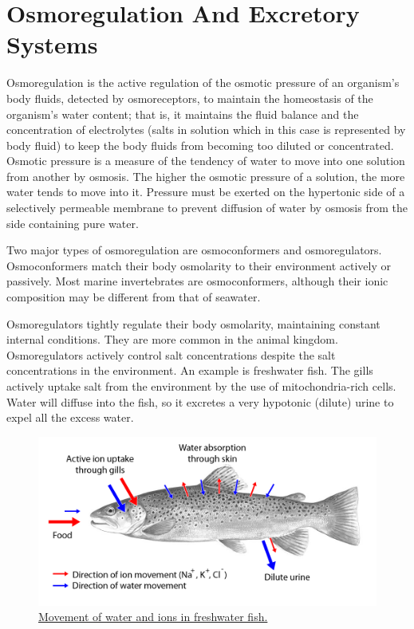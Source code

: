 \hypertarget{osmoregulation-and-excretory-systems}{%
\chapter{Osmoregulation And Excretory Systems}\label{osmoregulation-and-excretory-systems}}

Osmoregulation is the active regulation of the osmotic pressure of an organism's body fluids, detected by osmoreceptors, to maintain the homeostasis of the organism's water content; that is, it maintains the fluid balance and the concentration of electrolytes (salts in solution which in this case is represented by body fluid) to keep the body fluids from becoming too diluted or concentrated. Osmotic pressure is a measure of the tendency of water to move into one solution from another by osmosis. The higher the osmotic pressure of a solution, the more water tends to move into it. Pressure must be exerted on the hypertonic side of a selectively permeable membrane to prevent diffusion of water by osmosis from the side containing pure water.

Two major types of osmoregulation are osmoconformers and osmoregulators. Osmoconformers match their body osmolarity to their environment actively or passively. Most marine invertebrates are osmoconformers, although their ionic composition may be different from that of seawater.

Osmoregulators tightly regulate their body osmolarity, maintaining constant internal conditions. They are more common in the animal kingdom. Osmoregulators actively control salt concentrations despite the salt concentrations in the environment. An example is freshwater fish. The gills actively uptake salt from the environment by the use of mitochondria-rich cells. Water will diffuse into the fish, so it excretes a very hypotonic (dilute) urine to expel all the excess water.



\begin{figure}

{\centering \includegraphics[width=0.7\linewidth]{./figures/excretory/Bachforelle_osmoregulatoin_bw_en2} 

}

\caption{\href{https://en.wikipedia.org/wiki/Osmoregulation\#/media/File:Bachforelle_osmoregulatoin_bw_en2.png}{Movement of water and ions in freshwater fish.}}\label{fig:freshwaterfish}
\end{figure}

